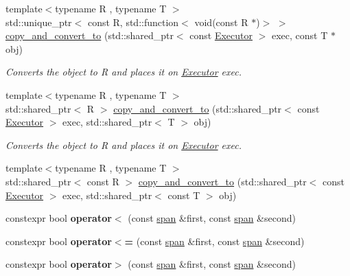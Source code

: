 \begin{DoxyCompactItemize}
{\footnotesize template$<$typename R , typename T $>$ }\\std\+::unique\+\_\+ptr$<$ const R, std\+::function$<$ void(const R $\ast$)$>$ $>$ \hyperlink{namespacegko_add859060efaa729c84788bb4f6582e9f}{copy\+\_\+and\+\_\+convert\+\_\+to} (std\+::shared\+\_\+ptr$<$ const \hyperlink{classgko_1_1Executor}{Executor} $>$ exec, const T $\ast$obj)
\begin{DoxyCompactList}\small\item\em Converts the object to R and places it on \hyperlink{classgko_1_1Executor}{Executor} exec. \end{DoxyCompactList}\item 
{\footnotesize template$<$typename R , typename T $>$ }\\std\+::shared\+\_\+ptr$<$ R $>$ \hyperlink{namespacegko_ac2b925f8d9f288210c7d1f0e00e5c495}{copy\+\_\+and\+\_\+convert\+\_\+to} (std\+::shared\+\_\+ptr$<$ const \hyperlink{classgko_1_1Executor}{Executor} $>$ exec, std\+::shared\+\_\+ptr$<$ T $>$ obj)
\begin{DoxyCompactList}\small\item\em Converts the object to R and places it on \hyperlink{classgko_1_1Executor}{Executor} exec. \end{DoxyCompactList}\item 
{\footnotesize template$<$typename R , typename T $>$ }\\std\+::shared\+\_\+ptr$<$ const R $>$ \hyperlink{namespacegko_a0f28847393e540a33fdda8cd80584789}{copy\+\_\+and\+\_\+convert\+\_\+to} (std\+::shared\+\_\+ptr$<$ const \hyperlink{classgko_1_1Executor}{Executor} $>$ exec, std\+::shared\+\_\+ptr$<$ const T $>$ obj)
\item 
\mbox{\label{namespacegko_a22cd8a74bb04c04ba81d88de0d0677b2}} 
constexpr bool {\bfseries operator$<$} (const \hyperlink{structgko_1_1span}{span} \&first, const \hyperlink{structgko_1_1span}{span} \&second)
\item 
\mbox{\label{namespacegko_aece8127f67d50be468da56463320819f}} 
constexpr bool {\bfseries operator$<$=} (const \hyperlink{structgko_1_1span}{span} \&first, const \hyperlink{structgko_1_1span}{span} \&second)
\item 
\mbox{\label{namespacegko_abfec3871dd48b1b7abd345404fc5fea4}} 
constexpr bool {\bfseries operator$>$} (const \hyperlink{structgko_1_1span}{span} \&first, const \hyperlink{structgko_1_1span}{span} \&second)

\end{DoxyCompactItemize}

